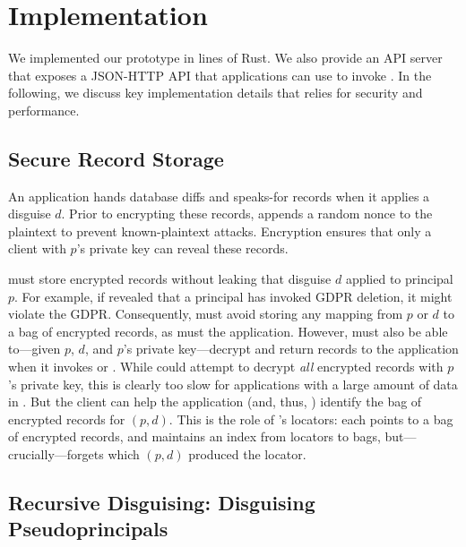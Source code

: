 \section{Implementation}

%
We implemented our \sys prototype in  lines of Rust.
%
We also provide an API server that exposes a JSON-HTTP API that applications
can use to invoke \sys.
%
In the following, we discuss key implementation details that \sys relies for
security and performance.
%

\subsection{Secure Record Storage}
%
An application hands \sys database diffs and speaks-for records when it applies
a disguise $d$.
%
Prior to encrypting these records, \sys appends a random nonce to the plaintext
to prevent known-plaintext attacks.
%
Encryption ensures that only a client with $p$'s private key can reveal these
records.
%

%
\sys must store encrypted records without leaking that disguise $d$ applied to
principal $p$.
%
For example, if \sys revealed that a principal has invoked GDPR deletion, it
might violate the GDPR.
%
Consequently, \sys must avoid storing any mapping from $p$ or $d$ to a bag of
encrypted records, as must the application.
%
However, \sys must also be able to---given $p$, $d$, and $p$'s private
key---decrypt and return records to the application when it invokes
 or .
%
While \sys could attempt to decrypt \emph{all} encrypted records with $p$'s
private key, this is clearly too slow for applications with a large amount
of data in \sys.
%
But the client can help the application (and, thus, \sys) identify the bag
of encrypted records for $(p, d)$.
%
This is the role of \sys's locators: each  points to a bag of
encrypted records, and \sys maintains an index from locators to bags,
but---crucially---forgets which $(p, d)$ produced the locator.
%

\subsection{Recursive Disguising: Disguising Pseudoprincipals}
\label{s:composition}

